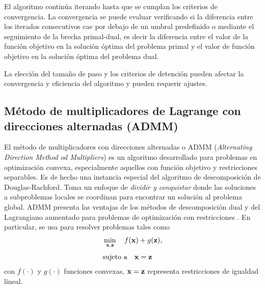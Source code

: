         El algoritmo continúa iterando hasta que se cumplan los criterios de convergencia. La convergencia se puede evaluar verificando si la diferencia entre los iterados consecutivos cae por debajo de un umbral predefinido o mediante el seguimiento de la brecha primal-dual, es decir la diferencia entre el valor de la función objetivo en la solución óptima del problema primal y el valor de función objetivo en la solución óptima del problema dual.

        La elección del tamaño de paso y los criterios de detención pueden afectar la convergencia y eficiencia del algoritmo y pueden requerir ajustes.

	\subsection{Método de multiplicadores de Lagrange con direcciones alternadas (ADMM)}\label{App:ADMM}
	
	El método de multiplicadores con direcciones alternadas o ADMM (\emph{Alternating Direction Method od Multipliers}) \cite{Boyd2011} es un algoritmo desarrollado para problemas en optimización convexa, especialmente aquellos con función objetivo y restricciones separables. Es de hecho una instancia especial del algoritmo de descomposición de Douglas-Rachford. Toma un enfoque de \emph{dividir y conquistar} donde las soluciones a subproblemas locales se coordinan para encontrar un solución al problema global. ADMM presenta las ventajas de los métodos de descomposición dual y del Lagrangiano aumentado para problemas de optimización con restricciones \cite{Parikh2014}. 
    En particular, se usa para resolver problemas tales como
	\begin{equation}
		\begin{aligned} 
			& \min_{\mathbf{x},\mathbf{z}}\quad f(\mathbf{x}) + g(\mathbf{z}), \\[0.3em]
			& \text{sujeto a}\quad \mathbf{x} = \mathbf{z}
		\end{aligned}
		\label{eq:dr1}
	\end{equation}
	con $f(\cdot)$ y $g(\cdot)$ funciones convexas, $\mathbf{x}=\mathbf{z}$ representa restricciones de igualdad lineal.
	
